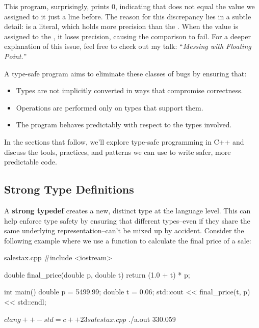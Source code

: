 \documentclass[12pt]{article}
\begin{document}
\noindent
This program, surprisingly, prints 0, indicating that  does not equal the value we assigned to it just a line before.
The reason for this discrepancy lies in a subtle detail:  is a  literal, which holds more precision than the .
When the  value is assigned to the , it loses precision, causing the comparison to fail.
For a deeper explanation of this issue, feel free to check out my talk: ``\textsl{Messing with Floating Point.}''


\noindent
A type-safe program aims to eliminate these classes of bugs by ensuring that:

\begin{itemize}
	\item Types are not implicitly converted in ways that compromise correctness.
	\item Operations are performed only on types that support them.
	\item The program behaves predictably with respect to the types involved.
\end{itemize}

\noindent
In the sections that follow, we’ll explore type-safe programming in C++ and discuss the tools, practices, and patterns we can use to write safer, more predictable code.

\pagebreak

\subsection{Strong Type Definitions}

\noindent
A \textbf{strong typedef} creates a new, distinct type at the language level.
This can help enforce type safety by ensuring that different types--even if they share the same underlying representation--can't be mixed up by accident.
Consider the following example where we use a function to calculate the final price of a sale:

\begin{cxx}{salestax.cpp}
#include <iostream>

double final_price(double p, double t)
{
	return (1.0 + t) * p;
}

int main()
{
	double p = 5499.99;
	double t = 0.06;
	std::cout << final_price(t, p) << std::endl;
}
\end{cxx}

\begin{terminal}
$ clang++ -std=c++23 salestax.cpp
$ ./a.out
330.059
\end{terminal}
\end{document}
